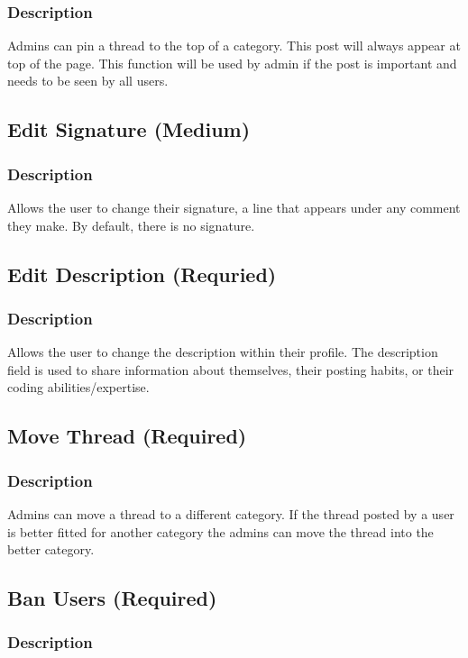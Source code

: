 \documentclass[12pt]{scrartcl}
\begin{document}
\subsubsection{Description}
Admins can pin a thread to the top of a category. This post will always appear at top of the page.
This function will be used by admin if the post is important and needs to be seen by all users.

\subsection{Edit Signature (Medium)}
\subsubsection{Description}
Allows the user to change their signature, a line that appears under any comment they make. By default, there is no signature.

\subsection{Edit Description (Requried)}
\subsubsection{Description}
Allows the user to change the description within their profile.
The description field is used to share information about themselves, their posting habits, or their coding abilities/expertise.

\subsection{Move Thread (Required)}
\subsubsection{Description}
Admins can move a thread to a different category.
If the thread posted by a user is better fitted for another category the admins can move the thread into the better category. 

\subsection{Ban Users (Required)}
\subsubsection{Description}
 
\end{document}
